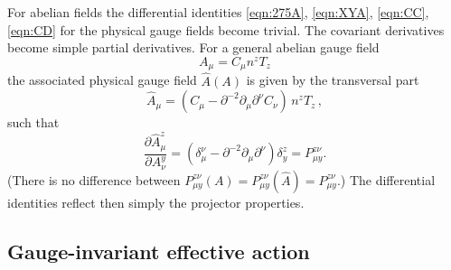 \documentclass[twocolumn,aps,prd,amsmath,amssymb,preprintnumbers,longbibliography]{revtex4-1}
\numberwithin{equation}{section}
\begin{document}
For abelian fields the differential identities \eqref{eqn:275A}, \eqref{eqn:XYA}, \eqref{eqn:CC}, \eqref{eqn:CD} for the physical gauge fields become trivial. The covariant derivatives become simple partial derivatives. For a general abelian gauge field
\begin{equation}\label{eq:AS:60D} 
A_{\mu}=C_{\mu}n^{z}T_{z}
\end{equation}
the associated physical gauge field $\hat{A}(A)$ is given by the transversal part
\begin{equation}\label{eq:AS:60E} 
\hat{A}_{\mu}=\left (C_{\mu}-\partial^{-2}\partial_{\mu}\partial^{\nu}C_{\nu}\right )\, n^{z}T_{z}\, ,
\end{equation}
such that
\begin{equation}\label{eq:AS:60F}
\dfrac{\partial \hat{A}^{z}_{\mu}}{\partial A_{\nu}^{y}}=\left (\delta^{\nu}_{\mu}-\partial^{-2}\partial_{\mu}\partial^{\nu}\right )\delta_{y}^{z}=P_{\mu y}^{z\nu}.
\end{equation}
(There is no difference between $P_{\mu y}^{z\nu}(A)=P_{\mu y}^{z\nu}(\hat{A})=P_{\mu y}^{z\nu}$.) The differential identities reflect then simply the projector properties.











\subsection{Gauge-invariant effective action}
\end{document}

